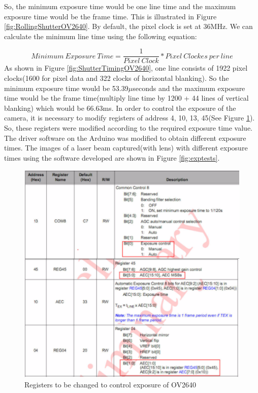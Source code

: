 So, the minimum exposure time would be one line time and the maximum exposure time would be the frame time. This is illustrated in Figure \ref{fig:RollingShutterOV2640}. By default, the pixel clock is set at 36MHz. We can calculate the minimum line time using the following equation:

$$
Minimum\ Exposure\ Time = \frac{1}{Pixel\ Clock} * Pixel \ Clockes \ per \ line 
$$
As shown in Figure \ref{fig:ShutterTimingOV2640}, one line consists of 1922 pixel clocks(1600 for pixel data and 322 clocks of horizontal blanking). So the minimum exposure time would be 53.39$\mu$seconds and the maximum exposure time would be the frame time(multiply line time by 1200 + 44 lines of vertical blanking) which would be 66.63ms\cite{RollingShutterOV2640}. In order to control the exposure of the camera, it is necessary to modify registers of address 4, 10, 13, 45(See Figure \ref{fig:OV2640Registers}). So, these registers were modified according to the required exposure time value. The driver software on the Arduino was modified to obtain different exposure times. The images of a laser beam captured(with lens) with different exposure times using the software developed are shown in Figure \ref{fig:exptests}.

\begin{figure}[!ht]
\includegraphics[width=\textwidth]{pics/exposure/OV2640ExposureRegisters}
\caption{Registers to be changed to control exposure of OV2640\cite{OV2640DS}\cite{RollingShutterOV2640}}
\label{fig:OV2640Registers}
\end{figure}


